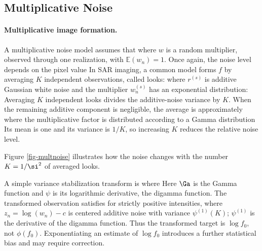                                                      
\subsection{Multiplicative Noise}

  
\paragraph{Multiplicative image formation.}

A multiplicative noise model assumes that
where $w$ is a random multiplier, observed through one realization, with $\mathbb E(w_n)=1$.
Once again, the noise level depends on the pixel value
In SAR imaging, a common model forms $f$ by averaging $K$ independent observations, called looks:
where $r^{(s)}$ is additive Gaussian white noise and the multiplier $w^{(s)}_n$ has an exponential distribution:
Averaging $K$ independent looks divides the additive-noise variance by $K$. When the remaining additive component is negligible, the average is approximately
where the multiplicative factor is distributed according to a Gamma distribution
Its mean is one and its variance is $1/K$, so increasing $K$ reduces the relative noise level.


Figure \ref{fig-multnoise} illustrates how the noise changes with the number $K=1/\si^2$ of averaged looks.

A simple variance stabilization transform is
where
Here $\Ga$ is the Gamma function and $\psi$ is its logarithmic derivative, the digamma function. The transformed observation satisfies
for strictly positive intensities, where $z_n=\log(w_n)-c$ is centered additive noise with variance $\psi^{(1)}(K)$; $\psi^{(1)}$ is the derivative of the digamma function. Thus the transformed target is $\log f_0$, not $\phi(f_0)$. Exponentiating an estimate of $\log f_0$ introduces a further statistical bias and may require correction.

